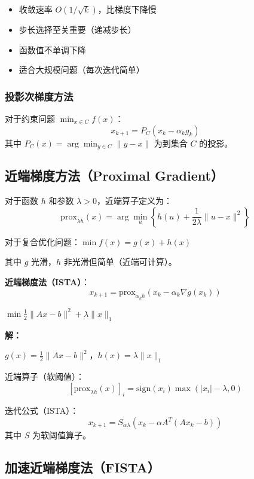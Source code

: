 \begin{notebox}[次梯度方法的特点]
\begin{itemize}
    \item 收敛速率 $O(1/\sqrt{k})$，比梯度下降慢
    \item 步长选择至关重要（递减步长）
    \item 函数值不单调下降
    \item 适合大规模问题（每次迭代简单）
\end{itemize}
\end{notebox}

\subsubsection{投影次梯度方法}

对于约束问题 $\min_{x \in C} f(x)$：
\[
x_{k+1} = P_C(x_k - \alpha_k g_k)
\]
其中 $P_C(x) = \arg\min_{y \in C} \|y - x\|$ 为到集合 $C$ 的投影。

\subsection{近端梯度方法（Proximal Gradient）}\label{sec:proximal}

\begin{conceptbox}[近端算子]
对于函数 $h$ 和参数 $\lambda > 0$，近端算子定义为：
\[
\text{prox}_{\lambda h}(x) = \arg\min_u \left\{h(u) + \frac{1}{2\lambda}\|u - x\|^2\right\}
\]
\end{conceptbox}

对于复合优化问题：$\min f(x) = g(x) + h(x)$

其中 $g$ 光滑，$h$ 非光滑但简单（近端可计算）。

\textbf{近端梯度法（ISTA）}：
\[
x_{k+1} = \text{prox}_{\alpha_k h}(x_k - \alpha_k \nabla g(x_k))
\]

\begin{example}[LASSO问题]
$\min \frac{1}{2}\|Ax - b\|^2 + \lambda\|x\|_1$

\textbf{解：}

$g(x) = \frac{1}{2}\|Ax - b\|^2$，$h(x) = \lambda\|x\|_1$

近端算子（软阈值）：
\[
[\text{prox}_{\lambda h}(x)]_i = \text{sign}(x_i) \max(|x_i| - \lambda, 0)
\]

迭代公式（ISTA）：
\[
x_{k+1} = S_{\alpha \lambda}(x_k - \alpha A^T(Ax_k - b))
\]
其中 $S$ 为软阈值算子。
\end{example}

\subsection{加速近端梯度法（FISTA）}\label{sec:fista}

